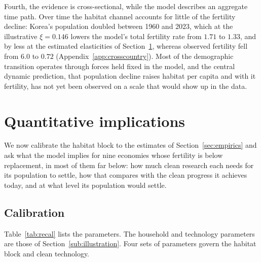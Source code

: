 \documentclass[11pt]{article}
\begin{document}
Fourth, the evidence is cross-sectional, while the model describes an aggregate time path. Over time
the habitat channel accounts for little of the fertility decline: Korea's population doubled between
1960 and 2023, which at the illustrative $\xi=0.146$ lowers the model's total fertility rate from $1.71$ to $1.33$, and by
less at the estimated elasticities of Section~\ref{sec:quant}, whereas
observed fertility fell from $6.0$ to $0.72$ (Appendix~\ref{app:crosscountry}). Most of the demographic
transition operates through forces held fixed in the model, and the central dynamic prediction, that
population decline raises habitat per capita and with it fertility, has not yet been observed on a
scale that would show up in the data.

\section{Quantitative implications}
\label{sec:quant}

We now calibrate the habitat block to the estimates of Section~\ref{sec:empirics} and ask what the
model implies for nine economies whose fertility is below replacement, in most of them far below: how much clean research each
needs for its population to settle, how that compares with the clean progress it achieves today, and at
what level its population would settle.

\subsection{Calibration}
\label{sub:recal}
Table~\ref{tab:recal} lists the parameters. The household and technology parameters are those of
Section~\ref{sub:illustration}. Four sets of parameters govern the habitat block and clean technology.
\end{document}
